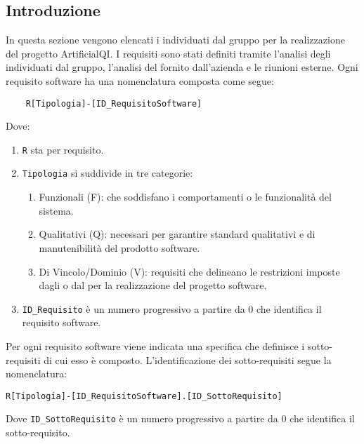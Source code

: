 
\subsection{Introduzione}
\label{sec:requisiti_software}
In questa sezione vengono elencati i  individuati dal gruppo per la realizzazione del progetto ArtificialQI.
I requisiti sono stati definiti tramite l'analisi degli  individuati dal gruppo, l'analisi del  fornito dall'azienda e le riunioni esterne.
Ogni requisito software ha una nomenclatura composta come segue:
\begin{lstlisting}
    R[Tipologia]-[ID_RequisitoSoftware]
\end{lstlisting}
Dove:
\begin{enumerate}
    \item \lstinline|R| sta per requisito.
    \item \lstinline|Tipologia| si suddivide in tre categorie:
    \begin{enumerate}
        \item Funzionali (F):  che soddisfano i comportamenti o le funzionalità del sistema.
        \item Qualitativi (Q):  necessari per garantire standard qualitativi e di manutenibilità
        del prodotto software.
        \item Di Vincolo/Dominio (V): requisiti che delineano le restrizioni imposte dagli  o dal  
        per la realizzazione del progetto software.
    \end{enumerate}
    \item \lstinline|ID_Requisito| è un numero progressivo a partire da 0 che identifica il requisito software.
\end{enumerate}  
Per ogni requisito software viene indicata una specifica che definisce i sotto-requisiti di cui esso è composto.
L'identificazione dei sotto-requisiti segue la nomenclatura:
\begin{lstlisting}
R[Tipologia]-[ID_RequisitoSoftware].[ID_SottoRequisito]
\end{lstlisting} 
Dove \lstinline|ID_SottoRequisito| è un numero progressivo a partire da 0 che identifica il sotto-requisito.
